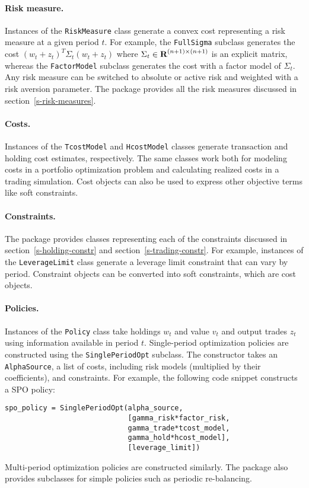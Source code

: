 \documentclass[openany]{now}
\renewcommand{\S}{section~}
\begin{document}
\paragraph{Risk measure.} Instances of the \verb|RiskMeasure| class
generate a convex cost representing a risk measure at a given period $t$.
For example, the \verb|FullSigma| subclass generates the cost $(w_t +
z_t)^T\Sigma_t(w_t + z_t)$ where $\Sigma_t \in {\mbox{\bf R}}^{(n+1) \times (n+1)}$ is
an explicit matrix, whereas the \verb|FactorModel| subclass generates the
cost with a factor model of $\Sigma_t$.
Any risk measure can be switched to absolute or active risk and weighted with a
risk aversion parameter.
The package provides all the risk measures discussed in \S\ref{s-risk-measures}.

\paragraph{Costs.} Instances of the \verb|TcostModel| and \verb|HcostModel| classes generate
transaction and holding cost estimates, respectively.
The same classes work both for modeling costs in a portfolio optimization
problem and calculating realized costs in a trading simulation.
Cost objects can also be used to express other objective terms like soft constraints.

\paragraph{Constraints.} The package provides classes representing each of the
constraints discussed in \S\ref{s-holding-constr} and \S\ref{s-trading-constr}.
For example, instances of the \verb|LeverageLimit| class generate a leverage limit
constraint that can vary by period.
Constraint objects can be converted into soft constraints, which are cost objects.

\paragraph{Policies.} Instances of the \verb|Policy| class take holdings $w_t$ and value $v_t$ and
output trades $z_t$ using information available in period $t$.
Single-period optimization policies are constructed using the
\verb|SinglePeriodOpt| subclass.
The constructor takes an \verb|AlphaSource|, a list of
costs, including risk models (multiplied by their coefficients), and constraints.
For example, the following code snippet constructs a SPO policy:
\begin{verbatim}
spo_policy = SinglePeriodOpt(alpha_source,
                             [gamma_risk*factor_risk,
                             gamma_trade*tcost_model,
                             gamma_hold*hcost_model],
                             [leverage_limit])
\end{verbatim}
Multi-period optimization policies are constructed similarly.
The package also provides subclasses for simple policies such as periodic re-balancing.
\end{document}
